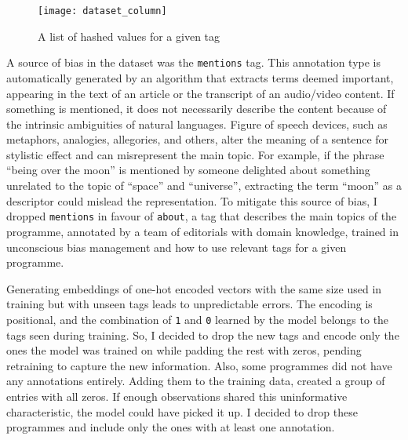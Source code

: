 \begin{figure}[h]
  \centering
  \texttt{[image: dataset\_column]}
  \caption{A list of hashed values for a given tag}
  \label{fig:dataset_column}
\end{figure}

A source of bias in the dataset was the \verb|mentions| tag.
This annotation type is automatically generated by an algorithm that extracts terms deemed important,
appearing in the text of an article or the transcript of an audio/video content.
If something is mentioned, it does not necessarily describe the content because of the intrinsic ambiguities of natural languages.
Figure of speech devices, such as metaphors, analogies, allegories, and others, alter the meaning of a sentence for stylistic effect
and can misrepresent the main topic.
For example, if the phrase ``being over the moon'' is mentioned by someone delighted about something unrelated to the topic of ``space'' and ``universe'',
extracting the term ``moon'' as a descriptor could mislead the representation.
To mitigate this source of bias, I dropped \verb|mentions| in favour of \verb|about|,
a tag that describes the main topics of the programme, annotated by a team of editorials with domain knowledge,
trained in unconscious bias management and how to use relevant tags for a given programme.

Generating embeddings of one-hot encoded vectors with the same size used in training but with
unseen tags leads to unpredictable errors.
The encoding is positional, and the combination of \verb|1| and \verb|0| learned by the model
belongs to the tags seen during training. So, I decided to drop the new tags and encode only the ones the model was trained on
while padding the rest with zeros, pending retraining to capture the new information.
Also, some programmes did not have any annotations entirely. Adding them to the training data, created a group of entries with all zeros.
If enough observations shared this uninformative characteristic, the model could have picked it up.
I decided to drop these programmes and include only the ones with at least one annotation.
